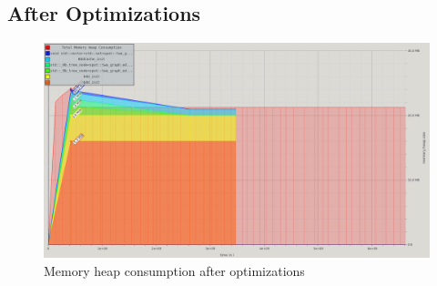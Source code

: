 \begin{landscape}
\subsection{After Optimizations}
\begin{figure}[H]
 \centering
 \includegraphics[scale=0.6]{img/memory_now.png}
 \caption{Memory heap consumption after optimizations}
 \label{fig:memory_now}
\end{figure}

\end{landscape}